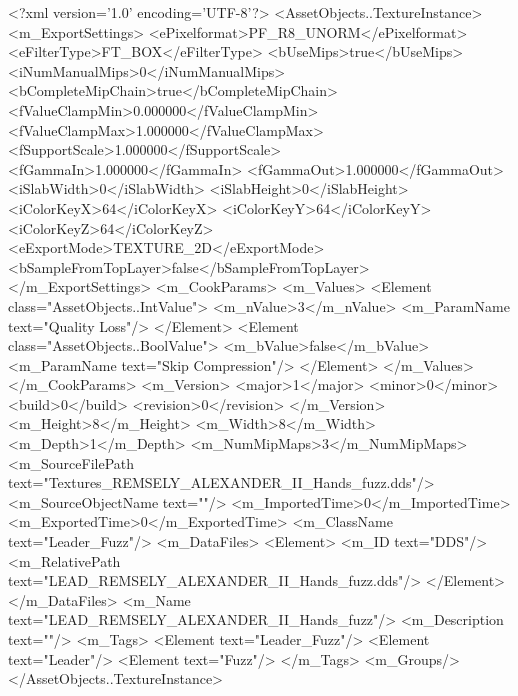 <?xml version='1.0' encoding='UTF-8'?>
<AssetObjects..TextureInstance>
  <m_ExportSettings>
    <ePixelformat>PF_R8_UNORM</ePixelformat>
    <eFilterType>FT_BOX</eFilterType>
    <bUseMips>true</bUseMips>
    <iNumManualMips>0</iNumManualMips>
    <bCompleteMipChain>true</bCompleteMipChain>
    <fValueClampMin>0.000000</fValueClampMin>
    <fValueClampMax>1.000000</fValueClampMax>
    <fSupportScale>1.000000</fSupportScale>
    <fGammaIn>1.000000</fGammaIn>
    <fGammaOut>1.000000</fGammaOut>
    <iSlabWidth>0</iSlabWidth>
    <iSlabHeight>0</iSlabHeight>
    <iColorKeyX>64</iColorKeyX>
    <iColorKeyY>64</iColorKeyY>
    <iColorKeyZ>64</iColorKeyZ>
    <eExportMode>TEXTURE_2D</eExportMode>
    <bSampleFromTopLayer>false</bSampleFromTopLayer>
  </m_ExportSettings>
  <m_CookParams>
    <m_Values>
      <Element class="AssetObjects..IntValue">
        <m_nValue>3</m_nValue>
        <m_ParamName text="Quality Loss"/>
      </Element>
      <Element class="AssetObjects..BoolValue">
        <m_bValue>false</m_bValue>
        <m_ParamName text="Skip Compression"/>
      </Element>
    </m_Values>
  </m_CookParams>
  <m_Version>
    <major>1</major>
    <minor>0</minor>
    <build>0</build>
    <revision>0</revision>
  </m_Version>
  <m_Height>8</m_Height>
  <m_Width>8</m_Width>
  <m_Depth>1</m_Depth>
  <m_NumMipMaps>3</m_NumMipMaps>
  <m_SourceFilePath text="Textures\LEAD_REMSELY_ALEXANDER_II_Hands_fuzz.dds"/>
  <m_SourceObjectName text=""/>
  <m_ImportedTime>0</m_ImportedTime>
  <m_ExportedTime>0</m_ExportedTime>
  <m_ClassName text="Leader_Fuzz"/>
  <m_DataFiles>
    <Element>
      <m_ID text="DDS"/>
      <m_RelativePath text="LEAD_REMSELY_ALEXANDER_II_Hands_fuzz.dds"/>
    </Element>
  </m_DataFiles>
  <m_Name text="LEAD_REMSELY_ALEXANDER_II_Hands_fuzz"/>
  <m_Description text=""/>
  <m_Tags>
    <Element text="Leader_Fuzz"/>
    <Element text="Leader"/>
    <Element text="Fuzz"/>
  </m_Tags>
  <m_Groups/>
</AssetObjects..TextureInstance>

